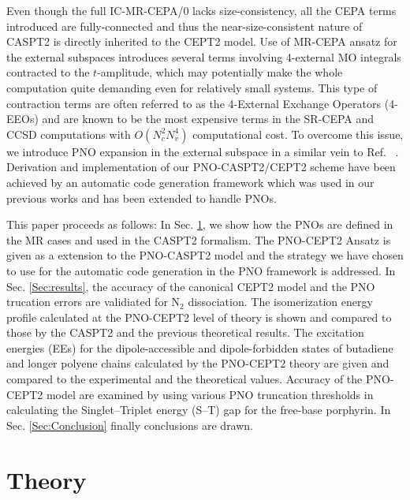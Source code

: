 \documentclass[aip,jcp,amsmath,twocolumn,floatfix,reprint,fleqn]{revtex4-1}
\begin{document}
%
Even though the full IC-MR-CEPA/0 lacks size-consistency, all the CEPA terms introduced are fully-connected and thus the near-size-consistent nature of CASPT2 is directly inherited to the CEPT2 model.
%
%
Use of MR-CEPA ansatz for the external subspaces introduces several terms involving 4-external MO integrals contracted to the $t$-amplitude, which may potentially make the whole computation quite demanding even for relatively small systems.
%
This type of contraction terms are often referred to as the 4-External Exchange Operators (4-EEOs) and are known to be the most expensive terms in the SR-CEPA and CCSD computations with $O(N_c^2 N_v^4)$ computational cost.
%
To overcome this issue, we introduce PNO expansion in the external subspace in a similar vein to Ref. ~.
%
Derivation and implementation of our PNO-CASPT2/CEPT2 scheme have been achieved by an automatic code generation framework which was used in our previous works\cite{saitowmultireference2013,doi:10.1021/acs.jctc.5b00270} and has been extended to handle PNOs.

%
This paper proceeds as follows:
%
In Sec. \ref{Sec:theory}, we show how the PNOs are defined in the MR cases and used in the CASPT2 formalism.
%
The PNO-CEPT2 Ansatz is given as a extension to the PNO-CASPT2 model and the strategy we have chosen to use for the automatic code generation in the PNO framework is addressed.
%
In Sec. \ref{Sec:results}, the accuracy of the canonical CEPT2 model and the PNO trucation errors are validiated for N${}_2$ dissociation.
%
The isomerization energy profile calculated at the PNO-CEPT2 level of theory is shown and compared to those by the CASPT2 and the previous theoretical results.
%
The excitation energies (EEs) for the dipole-accessible and dipole-forbidden states of butadiene and longer polyene chains calculated by the PNO-CEPT2 theory are given and compared to the experimental and the theoretical values.
%
Accuracy of the PNO-CEPT2 model are examined by using various PNO truncation thresholds in calculating the Singlet--Triplet energy (S--T) gap for the free-base porphyrin.
%
In Sec. \ref{Sec:Conclusion} finally conclusions are drawn.

\section{Theory}\label{Sec:theory}
\end{document}
